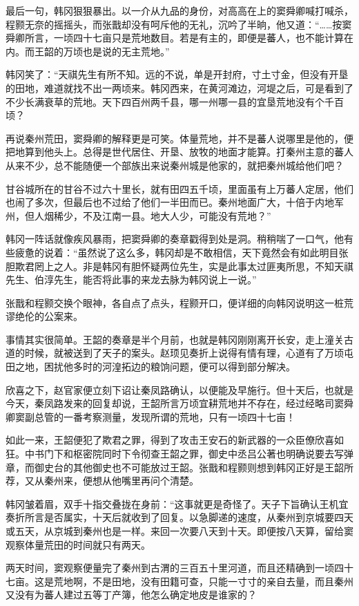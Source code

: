 最后一句，韩冈狠狠暴出。以一介从九品的身份，对高高在上的窦舜卿喊打喊杀，程颢无奈的摇摇头，而张戬却没有呵斥他的无礼，沉吟了半晌，他又道：“……按窦舜卿所言，一顷四十七亩只是荒地数目。若是有主的，即便是蕃人，也不能计算在内。而王韶的万顷也是说的无主荒地。”

韩冈笑了：“天祺先生有所不知。远的不说，单是开封府，寸土寸金，但没有开垦的田地，难道就找不出一两顷来。韩冈西来，在黄河滩边，河堤之后，可是看到了不少长满衰草的荒地。天下四百州两千县，哪一州哪一县的宜垦荒地没有个千百顷？

再说秦州荒田，窦舜卿的解释更是可笑。体量荒地，并不是蕃人说哪里是他的，便把地算到他头上。总得是世代居住、开垦、放牧的地面才能算。打秦州主意的蕃人从来不少，总不能随便一个部族出来说秦州城是他家的，就把秦州城给他们吧？

甘谷城所在的甘谷不过六十里长，就有田四五千顷，里面虽有上万蕃人定居，他们也闹了多次，但最后也不过给了他们一半田而已。秦州地面广大，十倍于内地军州，但人烟稀少，不及江南一县。地大人少，可能没有荒地？”

韩冈一阵话就像疾风暴雨，把窦舜卿的奏章戳得到处是洞。稍稍喘了一口气，他有些疲惫的说着：“虽然说了这么多，韩冈却是不敢相信，天下竟然会有如此明目张胆欺君罔上之人。非是韩冈有胆怀疑两位先生，实是此事太过匪夷所思，不知天祺先生、伯淳先生，能否将此事的来龙去脉为韩冈说上一说。”

张戬和程颢交换个眼神，各自点了点头，程颢开口，便详细的向韩冈说明这一桩荒谬绝伦的公案来。

事情其实很简单。王韶的奏章是半个月前，也就是韩冈刚刚离开长安，走上潼关古道的时候，就被送到了天子的案头。赵顼见奏折上说得有情有理，心道有了万顷屯田之地，困扰他多时的河湟拓边的粮饷问题，便可以得到部分解决。

欣喜之下，赵官家便立刻下诏让秦凤路确认，以便能及早施行。但十天后，也就是今天，秦凤路发来的回复却说，王韶所言万顷宜耕荒地并不存在，经过经略司窦舜卿窦副总管的一番考察测量，发现所谓的荒地，只有一顷四十七亩！

如此一来，王韶便犯了欺君之罪，得到了攻击王安石的新武器的一众臣僚欣喜如狂。中书门下和枢密院同时下令彻查王韶之罪，御史中丞吕公著也明确说要去写弹章，而御史台的其他御史也不可能放过王韶。张戬和程颢则想到韩冈正好是王韶所荐，又从秦州来，便想从他嘴里再问个清楚。

韩冈皱着眉，双手十指交叠拢在身前：“这事就更是奇怪了。天子下旨确认王机宜奏折所言是否属实，十天后就收到了回复。以急脚递的速度，从秦州到京城要四天或五天，从京城到秦州也是一样。来回一次要八天到十天。即便按八天算，留给窦观察体量荒田的时间就只有两天。

两天时间，窦观察便量完了秦州到古渭的三百五十里河道，而且还精确到一顷四十七亩。这是荒地啊，不是田地，没有田籍可查，只能一寸寸的亲自去量，而且秦州又没有为蕃人建过五等丁产簿，他怎么确定地皮是谁家的？

